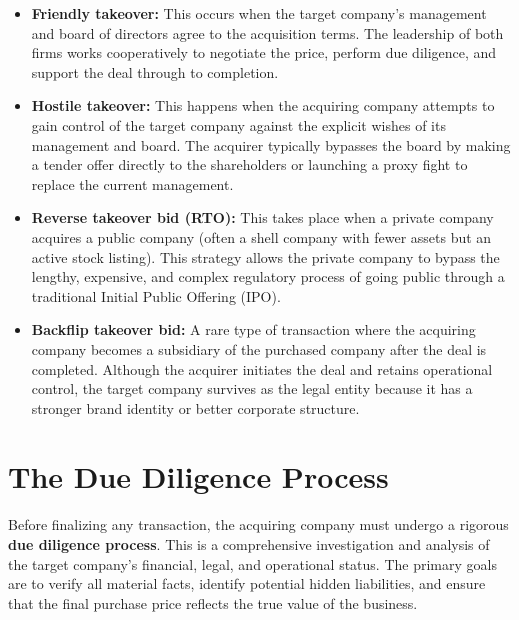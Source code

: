 \documentclass[12pt,a4paper]{report}
\begin{document}
\begin{itemize}
    \item \textbf{Friendly takeover:} This occurs when the target company's management and board of directors agree to the acquisition terms. The leadership of both firms works cooperatively to negotiate the price, perform due diligence, and support the deal through to completion.
    
    \item \textbf{Hostile takeover:} This happens when the acquiring company attempts to gain control of the target company against the explicit wishes of its management and board. The acquirer typically bypasses the board by making a tender offer directly to the shareholders or launching a proxy fight to replace the current management.
    
    \item \textbf{Reverse takeover bid (RTO):} This takes place when a private company acquires a public company (often a shell company with fewer assets but an active stock listing). This strategy allows the private company to bypass the lengthy, expensive, and complex regulatory process of going public through a traditional Initial Public Offering (IPO).
    
    \item \textbf{Backflip takeover bid:} A rare type of transaction where the acquiring company becomes a subsidiary of the purchased company after the deal is completed. Although the acquirer initiates the deal and retains operational control, the target company survives as the legal entity because it has a stronger brand identity or better corporate structure.
\end{itemize}
\section{The Due Diligence Process}
Before finalizing any transaction, the acquiring company must undergo a rigorous \textbf{due diligence process}. This is a comprehensive investigation and analysis of the target company's financial, legal, and operational status. The primary goals are to verify all material facts, identify potential hidden liabilities, and ensure that the final purchase price reflects the true value of the business.
\end{document}
